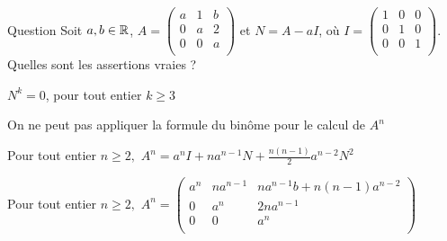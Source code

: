 \begin{multi}[multiple,feedback=
{On a : \(N=\left(\begin{array}{rcc}
0&1&b\\0&0&2\\ 0&0&0\\ \end{array}\right)\),  \(N^2=\left(\begin{array}{rcc}0&0&2\\0&0&0\\ 0&0&0\\ 
\end{array}\right)\) et \(N^k=0, \) pour tout \(k\ge 3\).
\vskip0mm
On a : \(A= N+aI\). Comme le produit des matrices \(N\) et \(aI\) est commutatif, on peut appliquer la formule du binôme pour le calcul des puissances de \(A\).
}]{Question}
Soit \(a,b\in \mathbb{R}\), \(A=\left(\begin{array}{rcc}a&1&b\\0&a&2\\ 0&0&a\\ 
\end{array}\right)\) et  \(N= A-aI\), où \(I= \left(\begin{array}{rcc}
1&0&0\\0&1&0\\ 0&0&1\\ \end{array}\right)\). Quelles sont les assertions vraies ?

    \item* \(N^k = 0\), pour tout entier \(k\ge 3\)
    \item On ne peut pas appliquer la formule du binôme pour le calcul de \(A^n\)
    \item* Pour tout entier \(n \ge 2,\) \(\displaystyle A^n =a^nI+na^{n-1}N+\frac{n(n-1)}{2}a^{n-2}N^2 \)
    \item* Pour tout entier \(n \ge 2,\) \(A^n=\left(\begin{array}{rcc}
a^n&na^{n-1}&na^{n-1}b+n(n-1)a^{n-2}\\0&a^n&2na^{n-1}\\ 0&0&a^n\\ \end{array}\right)\)
\end{multi}


